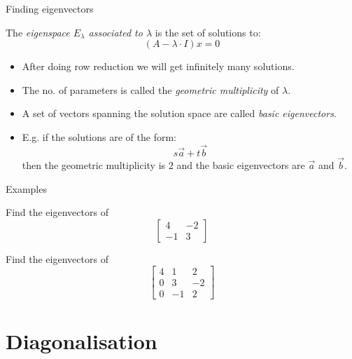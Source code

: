 \documentclass{beamer}
\begin{document}
\begin{frame}{Finding eigenvectors}
\begin{definition}
The \emph{eigenspace $E_{\lambda}$ associated to $\lambda$} is the set of solutions to:
\begin{equation*}
(A-\lambda\cdot I)x = 0
\end{equation*}
\end{definition}\vfill
\begin{itemize}
	\item After doing row reduction we will get infinitely many solutions.
	\item The no. of parameters is called the \emph{geometric multiplicity} of $\lambda$.
	\item A set of vectors spanning the solution space are called \emph{basic eigenvectors}.
	\item E.g. if the solutions are of the form:
	\begin{equation*}
		s \vec{a} + t\vec{b}
	\end{equation*}
	then the geometric multiplicity is $2$ and the basic eigenvectors are $\vec{a}$ and $\vec{b}$.
\end{itemize}
\end{frame}

\begin{frame}{Examples}
\begin{example}
	Find the eigenvectors of
	\begin{equation*}
		\left[
		\begin{matrix}
		4&-2\\
		-1&3
		\end{matrix}
		\right]
	\end{equation*}
\end{example}
\begin{example}
	Find the eigenvectors of
	\begin{equation*}
		\left[
		\begin{matrix}
		4&1&2\\
		0&3&-2\\
		0&-1&2
		\end{matrix}
		\right]
	\end{equation*}
\end{example}
\end{frame}


\section{Diagonalisation}
\end{document}
